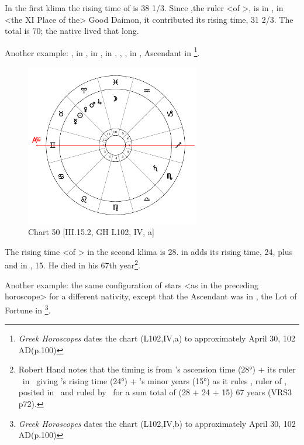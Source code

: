 In the first klima the rising time of \Virgo\xspace is 38 1/3. Since \Mercury,the ruler <of \Virgo>, is in \Cancer, in <the XI Place of the> Good Daimon, it contributed its rising time, 31 2/3. The total is 70; the native lived that long.

\newpage
Another example: \Sun, \Mercury\xspace in \Taurus, \Moon\xspace in \Pisces, \Saturn\xspace in \Scorpio, \Jupiter, \Mars, \Venus in \Aries, Ascendant in \Gemini
\footnote{\textit{Greek Horoscopes} dates the chart (L102,IV,a) to approximately April 30, 102 AD(p.100)}.

\clearpage
\begin{figure}
\centering
\vspace{-20pt}
\includegraphics[width=0.68\textwidth]{charts/3_15_2}
\caption{Chart 50 [III.15.2, GH L102, IV, a]}
\label{fig:chart50}
\end{figure} 

The rising time <of \Gemini> in the second klima is 28. \Mercury\xspace in \Taurus\xspace adds its rising time, 24, plus \Mars\xspace and \Venus\xspace in \Aries, 15. He died in his 67th year\footnote{Robert Hand notes that the timing is from \Gemini's ascension time (28°) + its ruler \Mercury\, in \Taurus\, giving \Taurus's rising time (24°) + \Mars's minor years (15°) as it rules \Venus, ruler of \Taurus, posited in \Aries\, and ruled by \Mars\, for a sum total of (28 + 24 + 15) 67 years (VRS3 p72).}.

\newpage
Another example: the same configuration of stars <as in the preceding horoscope> for a different nativity, except that the Ascendant was in \Capricorn, the Lot of Fortune in \Pisces
\footnote{\textit{Greek Horoscopes} dates the chart (L102,IV,b) to approximately April 30, 102 AD(p.100)}.

